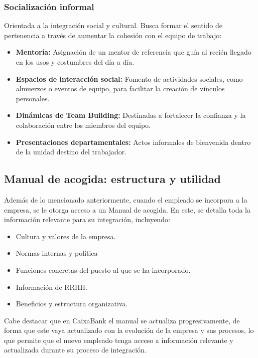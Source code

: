 \subsubsection{Socialización informal}

Orientada a la integración social y cultural. Busca formar el sentido de pertenencia a través de aumentar la cohesión con el equipo de trabajo:
\begin{itemize}
    \item \textbf{Mentoría:} Asignación de un mentor de referencia que guía al recién llegado en los usos y costumbres del día a día.
    \item \textbf{Espacios de interacción social:} Fomento de actividades sociales, como almuerzos o eventos de equipo, para facilitar la creación de vínculos personales.
    \item \textbf{Dinámicas de Team Building:} Destinadas a fortalecer la confianza y la colaboración entre los miembros del equipo.
    \item \textbf{Presentaciones departamentales:} Actos informales de bienvenida dentro de la unidad destino del trabajador.
\end{itemize}

\subsection{Manual de acogida: estructura y utilidad}

Además de lo mencionado anteriormente, cuando el empleado se incorpora a la empresa, se le otorga acceso a un Manual de acogida.
En este, se detalla toda la información relevante para su integración, incluyendo:
\begin{itemize}
    \item Cultura y valores de la empresa.
    \item Normas internas y política
    \item Funciones concretas del puesto al que se ha incorporado.
    \item Información de RRHH.
    \item Beneficios y estructura organizativa.
\end{itemize}

Cabe destacar que en CaixaBank el manual se actualiza progresivamente, de forma que este vaya actualizado con la evolución de la empresa y sus procesos, lo que permite que el nuevo empleado tenga acceso a información relevante y actualizada durante su proceso de integración.

